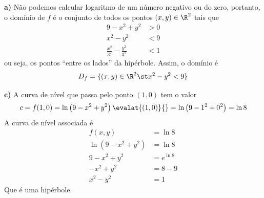 \documentclass[a4paper,12pt,fleqn]{article}
\begin{document}
\begin{answer}
  \textbf{a)} \quad
  Não podemos calcular logaritmo de um número negativo ou do zero,
  portanto, o domínio de $f$ é o conjunto
  de todos os pontos \((x, y)\in\R^2\) tais que
  \begin{align*}
    9-x^2+y^2                         & > 0 \\
    x^2 - y^2                         & < 9 \\
    \frac{x^2}{3^2} - \frac{y^2}{3^2} & < 1
  \end{align*}
  ou seja, os pontos ``entre os lados'' da hipérbole.
  Assim, o domínio é
  \[
    D_f = \{(x, y) \in \R^2 \st x^2 - y^2 < 9\}
  \]

  \bigskip
  \textbf{c)} \quad
  A curva de nível que passa pelo ponto $(1, 0)$ tem o valor
  \[
    c
    = f(1, 0)
    = \ln\left(9 -x^2 +y^2 \right) \evalat{(1, 0)}{}
    = \ln\left(9 -1^2 +0^2 \right)
    = \ln 8
  \]
  A curva de nível associada é
  \begin{align*}
    f(x, y)                   & = \ln 8     \\[2mm]
    \ln\left(9-x^2+y^2\right) & = \ln 8     \\[2mm]
    9 - x^2 + y^2             & = e^{\ln 8} \\[2mm]
    - x^2 + y^2               & = 8 - 9     \\[2mm]
    x^2 - y^2                 & = 1
  \end{align*}
  Que é uma hipérbole.
\end{answer}

\end{document}
